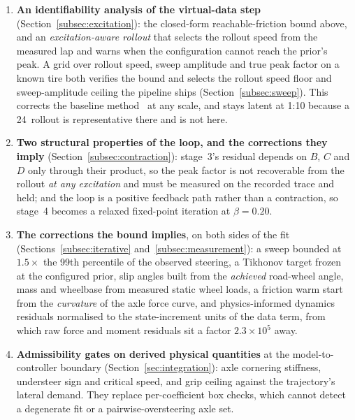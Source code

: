 \documentclass[lineno,12pt]{sn-jnl}
\makeatletter
\newif\ifsiu@prev
\DeclareRobustCommand{\siu@sep}{\ifsiu@prev\,\fi}
\DeclareRobustCommand{\siu@unit}[1]{\siu@sep\text{#1}\siu@prevtrue}
\DeclareRobustCommand{\siu@pre}[1]{\siu@sep\text{#1}\siu@prevfalse}
\DeclareRobustCommand{\siu@div}[1]{\text{#1}\siu@prevfalse}
\DeclareRobustCommand{\meter}{m}
\DeclareRobustCommand{\second}{s}
\DeclareRobustCommand{\gram}{g}
\DeclareRobustCommand{\newton}{N}
\DeclareRobustCommand{\radian}{rad}
\DeclareRobustCommand{\hertz}{Hz}
\DeclareRobustCommand{\percent}{\%}
\DeclareRobustCommand{\g}{\textit{g}}
\DeclareRobustCommand{\kilo}{k}
\DeclareRobustCommand{\milli}{m}
\DeclareRobustCommand{\per}{/}
\DeclareRobustCommand{\squared}{\ensuremath{^{2}}}
\providecommand{\degree}{\ensuremath{^{\circ}}}
\DeclareRobustCommand{\si}[1]{\begingroup
  \siu@prevfalse
  \renewcommand{\meter}{\siu@unit{m}}%
  \renewcommand{\second}{\siu@unit{s}}%
  \renewcommand{\gram}{\siu@unit{g}}%
  \renewcommand{\newton}{\siu@unit{N}}%
  \renewcommand{\radian}{\siu@unit{rad}}%
  \renewcommand{\hertz}{\siu@unit{Hz}}%
  \renewcommand{\percent}{\siu@unit{\%}}%
  \renewcommand{\degree}{\siu@unit{\ensuremath{^{\circ}}}}%
  \renewcommand{\g}{\siu@unit{\textit{g}}}%
  \renewcommand{\kilo}{\siu@pre{k}}%
  \renewcommand{\milli}{\siu@pre{m}}%
  \renewcommand{\per}{\siu@div{/}}%
  \renewcommand{\squared}{\ensuremath{^{2}}}%
  #1\endgroup}
\DeclareRobustCommand{\num}[1]{#1}
\DeclareRobustCommand{\SIrange}[3]{#1\text{--}#2\,\si{#3}}
\theoremstyle{thmstyleone}%
\theoremstyle{thmstyletwo}%
\theoremstyle{thmstylethree}%
\makeatother
\begin{document}
\begin{enumerate}
\item \textbf{An identifiability analysis of the virtual-data step}
(Section~\ref{subsec:excitation}): the closed-form reachable-friction bound
above, and an \emph{excitation-aware rollout} that selects the rollout speed
from the measured lap and warns when the configuration cannot reach the prior's
peak. A grid over rollout speed, sweep amplitude and true peak factor on a known
tire both verifies the bound and selects the rollout speed floor and sweep-amplitude
ceiling the pipeline ships (Section~\ref{subsec:sweep}). This corrects the baseline
method~\cite{ontrack2025} at any scale, and stays latent at 1:10 because a
\SIrange{2}{4}{\meter\per\second} rollout is representative there and is not
here.

\item \textbf{Two structural properties of the loop, and the corrections they
imply} (Section~\ref{subsec:contraction}): stage~3's residual depends on $B$,
$C$ and $D$ only through their product, so the peak factor is not recoverable
from the rollout \emph{at any excitation} and must be measured on the recorded
trace and held; and the loop is a positive feedback path rather than a
contraction, so stage~4 becomes a relaxed fixed-point iteration at
$\beta=\num{0.20}$.

\item \textbf{The corrections the bound implies}, on both sides of the fit
(Sections~\ref{subsec:iterative} and~\ref{subsec:measurement}): a sweep bounded
at $1.5\times$ the 99th percentile of the observed steering, a Tikhonov target
frozen at the configured prior, slip angles built from the \emph{achieved}
road-wheel angle, mass and wheelbase from measured static wheel loads, a
friction warm start from the \emph{curvature} of the axle force curve, and
physics-informed dynamics residuals normalised to the state-increment units of
the data term, from which raw force and moment residuals sit a factor
$\num{2.3}\times10^{5}$ away.

\item \textbf{Admissibility gates on derived physical quantities} at the
model-to-controller boundary (Section~\ref{sec:integration}): axle cornering
stiffness, understeer sign and critical speed, and grip ceiling against the
trajectory's lateral demand. They replace per-coefficient box checks, which
cannot detect a degenerate fit or a pairwise-oversteering axle set.


\end{enumerate}
\end{document}
